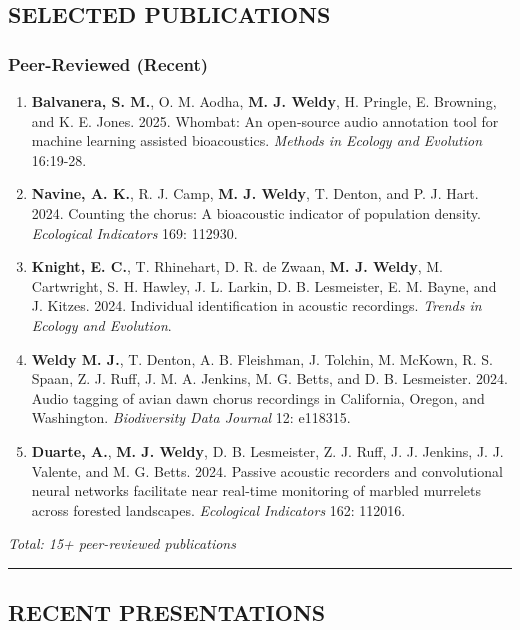 \documentclass[
  11pt,
  letterpaper,
  DIV=11,
  numbers=noendperiod]{scrartcl}
\begin{document}
\subsection{SELECTED PUBLICATIONS}\label{selected-publications}

\subsubsection{Peer-Reviewed (Recent)}\label{peer-reviewed-recent}

\begin{enumerate}
\def\labelenumi{\arabic{enumi}.}
\item
  \textbf{Balvanera, S. M.}, O. M. Aodha, \textbf{M. J. Weldy}, H.
  Pringle, E. Browning, and K. E. Jones. 2025. Whombat: An open‐source
  audio annotation tool for machine learning assisted bioacoustics.
  \emph{Methods in Ecology and Evolution} 16:19-28.
\item
  \textbf{Navine, A. K.}, R. J. Camp, \textbf{M. J. Weldy}, T. Denton,
  and P. J. Hart. 2024. Counting the chorus: A bioacoustic indicator of
  population density. \emph{Ecological Indicators} 169: 112930.
\item
  \textbf{Knight, E. C.}, T. Rhinehart, D. R. de Zwaan, \textbf{M. J.
  Weldy}, M. Cartwright, S. H. Hawley, J. L. Larkin, D. B. Lesmeister,
  E. M. Bayne, and J. Kitzes. 2024. Individual identification in
  acoustic recordings. \emph{Trends in Ecology and Evolution}.
\item
  \textbf{Weldy M. J.}, T. Denton, A. B. Fleishman, J. Tolchin, M.
  McKown, R. S. Spaan, Z. J. Ruff, J. M. A. Jenkins, M. G. Betts, and D.
  B. Lesmeister. 2024. Audio tagging of avian dawn chorus recordings in
  California, Oregon, and Washington. \emph{Biodiversity Data Journal}
  12: e118315.
\item
  \textbf{Duarte, A.}, \textbf{M. J. Weldy}, D. B. Lesmeister, Z. J.
  Ruff, J. J. Jenkins, J. J. Valente, and M. G. Betts. 2024. Passive
  acoustic recorders and convolutional neural networks facilitate near
  real-time monitoring of marbled murrelets across forested landscapes.
  \emph{Ecological Indicators} 162: 112016.
\end{enumerate}

\emph{Total: 15+ peer-reviewed publications}

\begin{center}\rule{0.5\linewidth}{0.5pt}\end{center}

\subsection{RECENT PRESENTATIONS}\label{recent-presentations}
\end{document}
